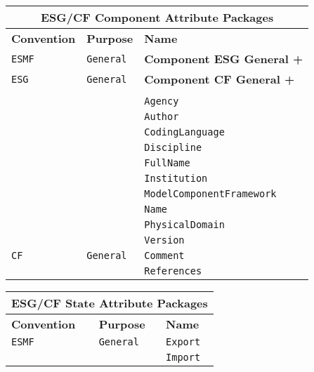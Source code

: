 \label{ComponentAttributePackages}
\begin{tabular}{|p{4cm}|p{4cm}|p{6cm}|}
\hline
\multicolumn{3}{|c|}{{\bf \large ESG/CF Component Attribute Packages}} \\
\hline\hline
{\bf Convention} & {\bf Purpose} & {\bf Name} \\
\hline\hline
{\tt ESMF} & {\tt General} & {\bf Component ESG General +} \\
{\tt ESG} & {\tt General} & {\bf Component CF General +} \\
     & & \\
     & & {\tt Agency} \\
     & & {\tt Author} \\
     & & {\tt CodingLanguage}  \\
     & & {\tt Discipline}  \\
     & & {\tt FullName} \\
     & & {\tt Institution} \\
     & & {\tt ModelComponentFramework} \\
     & & {\tt Name} \\
     & & {\tt PhysicalDomain}\\
     & & {\tt Version} \\ 
\hline
{\tt CF} & {\tt General} & {\tt Comment}\\
     & & {\tt References} \\
\hline
\end{tabular}

\vspace{18pt}

\label{StateAttributePackages}
\begin{tabular}{|p{4cm}|p{4cm}|p{6cm}|}
\hline
\multicolumn{3}{|c|}{{\bf \large ESG/CF State Attribute Packages}} \\
\hline\hline
{\bf Convention} & {\bf Purpose} & {\bf Name} \\
\hline\hline
{\tt ESMF} & {\tt General} & {\tt Export}  \\
 & & {\tt Import} \\ 
\hline
\end{tabular}

\vspace{18pt}

